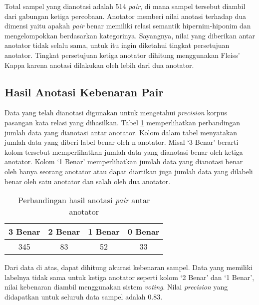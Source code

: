 Total sampel yang dianotasi adalah 514 \textit{pair}, di mana sampel tersebut diambil dari gabungan ketiga percobaan. Anotator memberi nilai anotasi terhadap dua dimensi yaitu apakah \textit{pair} benar memiliki relasi semantik hipernim-hiponim dan mengelompokkan berdasarkan kategorinya. Sayangnya, nilai yang diberikan antar anotator tidak selalu sama, untuk itu ingin diketahui tingkat persetujuan anotator. Tingkat persetujuan ketiga anotator dihitung menggunakan Fleiss' Kappa karena anotasi dilakukan oleh lebih dari dua anotator.

\subsection{Hasil Anotasi Kebenaran Pair}
Data yang telah dianotasi digunakan untuk mengetahui \textit{precision} korpus pasangan kata relasi yang dihasilkan. Tabel \ref{table:jumlah-bs} memperlihatkan perbandingan jumlah data yang dianotasi antar anotator. Kolom dalam tabel menyatakan jumlah data yang diberi label benar oleh n anotator. Misal `3 Benar' berarti kolom tersebut memperlihatkan jumlah data yang dianotasi benar oleh ketiga anotator. Kolom `1 Benar' memperlihatkan jumlah data yang dianotasi benar oleh hanya seorang anotator atau dapat diartikan juga jumlah data yang dilabeli benar oleh satu anotator dan salah oleh dua anotator.

\begin{table}
  \centering
  \caption{Perbandingan hasil anotasi \textit{pair} antar anotator}
  \label{table:jumlah-bs}
  \begin{tabular}{|c|c|c|c|}
  \hline
  3 Benar & 2 Benar & 1 Benar & 0 Benar \\ \hline
  345 & 83 & 52 & 33 \\ \hline
  \end{tabular} 
\end{table}

Dari data di atas, dapat dihitung akurasi kebenaran sampel. Data yang memiliki labelnya tidak sama untuk ketiga anotator seperti kolom `2 Benar' dan `1 Benar', nilai kebenaran diambil menggunakan sistem \textit{voting}. Nilai \textit{precision} yang didapatkan untuk seluruh data sampel adalah 0.83.

